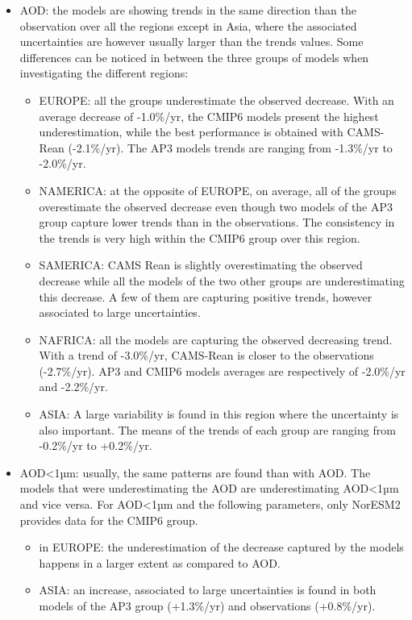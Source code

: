 \documentclass[journal abbreviation, manuscript]{copernicus}
\begin{document}
\begin{itemize}
 \item AOD: the models are showing trends in the same direction than the observation over all the regions except in Asia, where the associated uncertainties are however usually larger than the trends values. Some differences can be noticed in between the three groups of models when investigating the different regions:
       \begin{itemize}
        \item EUROPE: all the groups underestimate the observed decrease. With an average decrease of -1.0\%/yr, the CMIP6 models present the highest underestimation, while the best performance is obtained with CAMS-Rean (-2.1\%/yr). The AP3 models trends are ranging from -1.3\%/yr to -2.0\%/yr.
        \item NAMERICA: at the opposite of EUROPE, on average, all of the groups overestimate the observed decrease even though two models of the AP3 group capture lower trends than in the observations. The consistency in the trends is very high within the CMIP6 group over this region.
        \item SAMERICA: CAMS Rean is slightly overestimating the observed decrease while all the models of the two other groups are underestimating this decrease. A few of them are capturing positive trends, however associated to large uncertainties.
        \item NAFRICA: all the models are capturing the observed decreasing trend. With a trend of -3.0\%/yr, CAMS-Rean is closer to the observations (-2.7\%/yr). AP3 and CMIP6 models averages are respectively of -2.0\%/yr and -2.2\%/yr.
        \item ASIA: A large variability is found in this region where the uncertainty is also important. The means of the trends of each group are ranging from -0.2\%/yr to +0.2\%/yr.
       \end{itemize}
 \item AOD<1µm: usually, the same patterns are found than with AOD. The models that were underestimating the AOD are underestimating AOD<1µm and vice versa. For AOD<1µm and the following parameters, only NorESM2 provides data for the CMIP6 group.
       \begin{itemize}
        \item in EUROPE: the underestimation of the decrease captured by the models happens in a larger extent as compared to AOD.
        \item ASIA: an increase, associated to large uncertainties is found in both models of the AP3 group (+1.3\%/yr) and observations (+0.8\%/yr).

\end{itemize}
\end{itemize}
\end{document}
